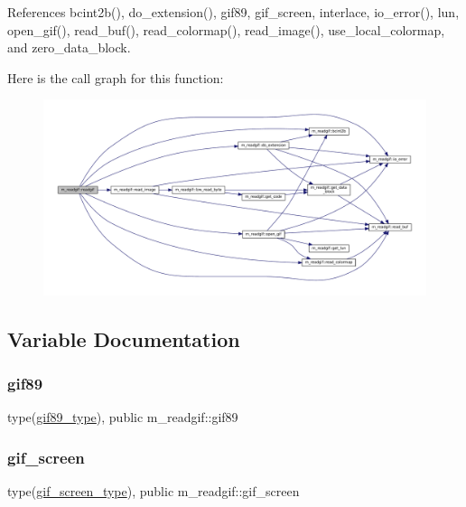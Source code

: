 References bcint2b(), do\+\_\+extension(), gif89, gif\+\_\+screen, interlace, io\+\_\+error(), lun, open\+\_\+gif(), read\+\_\+buf(), read\+\_\+colormap(), read\+\_\+image(), use\+\_\+local\+\_\+colormap, and zero\+\_\+data\+\_\+block.

Here is the call graph for this function\+:\nopagebreak
\begin{figure}[H]
\begin{center}
\leavevmode
\includegraphics[width=350pt]{namespacem__readgif_a775e2da2a9f54ec308e87a339a393ed6_cgraph}
\end{center}
\end{figure}


\subsection{Variable Documentation}
\mbox{\label{namespacem__readgif_a1d5a3f008ce6a2b13029a0977dba1aa1}} 
\subsubsection{\texorpdfstring{gif89}{gif89}}
{\footnotesize\ttfamily type(\mbox{\hyperlink{structm__readgif_1_1gif89__type}{gif89\+\_\+type}}), public m\+\_\+readgif\+::gif89}

\mbox{\label{namespacem__readgif_a6253fc469a2750e1d59bc498bca3d6eb}} 
\subsubsection{\texorpdfstring{gif\+\_\+screen}{gif\_screen}}
{\footnotesize\ttfamily type(\mbox{\hyperlink{structm__readgif_1_1gif__screen__type}{gif\+\_\+screen\+\_\+type}}), public m\+\_\+readgif\+::gif\+\_\+screen}

